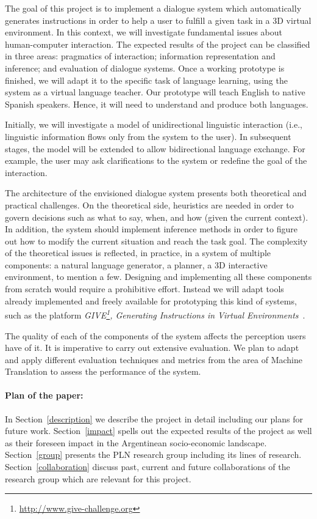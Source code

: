 
The goal of this project is to implement a dialogue system which automatically
generates instructions in order to help a user to fulfill a
given task in a 3D virtual environment. In this context, we will investigate
fundamental issues about human-computer interaction. The expected results of the
project can be classified in three areas: pragmatics
of interaction;  information representation and inference; and evaluation of
dialogue systems. Once a working prototype is finished, we will adapt it to
the specific task of language learning, using the system as a virtual language
teacher. Our prototype will teach English to native Spanish speakers. Hence, it
will need to understand and produce both languages.

Initially, we will investigate a model of unidirectional linguistic
interaction (i.e., linguistic information flows only from the system to the
user). In subsequent stages, the model will be
extended to allow bidirectional language exchange. For example, the user may
ask clarifications to the system or redefine the goal of the interaction.

The architecture of the envisioned dialogue system presents both theoretical and
practical challenges. On the theoretical side, heuristics are needed in order to
govern
decisions such as what to say, when, and how (given the current
context). In addition, the system should implement inference methods in order
to figure out how to modify the current situation and reach the task goal.
The complexity of
the theoretical issues is reflected, in practice, in a system of
multiple components: a natural language generator, a planner,
a 3D interactive environment, to mention a few. Designing
and implementing all these components from scratch would 
require a prohibitive effort. Instead we will adapt tools already implemented 
and freely available for prototyping this kind of 
systems, such as the platform
\emph{GIVE\footnote{\url{http://www.give-challenge.org}}, Generating
Instructions in Virtual
Environments}~\cite{byron09}. 

The quality of each of the components of the system affects the
perception users have of it. It is imperative to carry out 
extensive evaluation. 
We plan to adapt and apply different evaluation techniques and
metrics from the area of Machine Translation to assess the  
performance of the system.

\paragraph{Plan of the paper:} In Section~\ref{description} we describe 
the project in detail including our plans for future work. 
Section~\ref{impact} spells out the expected results of the project as
 well as their foreseen impact in the Argentinean socio-economic landscape. 
 Section~\ref{group} presents the PLN research group including its 
 lines of research. Section~\ref{collaboration} discuss past, current 
 and future collaborations of the research group which are relevant for this project.
 